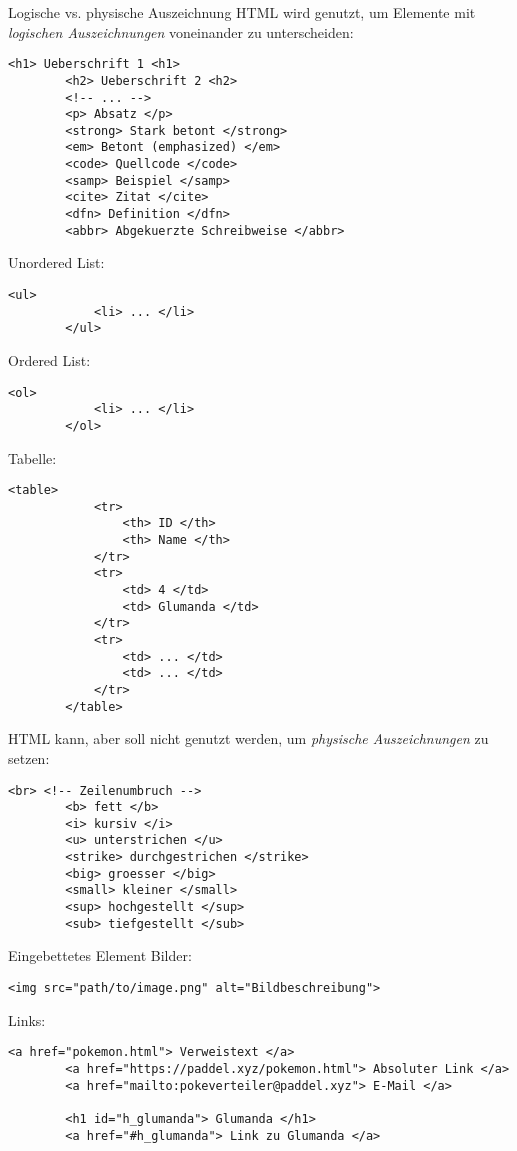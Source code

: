 \begin{bonus}{Logische vs. physische Auszeichnung}
    HTML wird genutzt, um Elemente mit \emph{logischen Auszeichnungen} voneinander zu unterscheiden:

    \begin{lstlisting}[language=html5]
        <h1> Ueberschrift 1 <h1>
        <h2> Ueberschrift 2 <h2>
        <!-- ... -->
        <p> Absatz </p>
        <strong> Stark betont </strong>
        <em> Betont (emphasized) </em>
        <code> Quellcode </code>
        <samp> Beispiel </samp>
        <cite> Zitat </cite>
        <dfn> Definition </dfn>
        <abbr> Abgekuerzte Schreibweise </abbr>
    \end{lstlisting}

    Unordered List:
    \begin{lstlisting}[language=html5]
        <ul>
            <li> ... </li>
        </ul>
    \end{lstlisting}

    Ordered List:
    \begin{lstlisting}[language=html5]
        <ol>
            <li> ... </li>
        </ol>
    \end{lstlisting}

    Tabelle:
    \begin{lstlisting}[language=html5]
        <table>
            <tr> 
                <th> ID </th> 
                <th> Name </th> 
            </tr>
            <tr> 
                <td> 4 </td> 
                <td> Glumanda </td> 
            </tr>
            <tr> 
                <td> ... </td> 
                <td> ... </td> 
            </tr>
        </table>
    \end{lstlisting}

    HTML kann, aber soll nicht genutzt werden, um \emph{physische Auszeichnungen} zu setzen:

    \begin{lstlisting}[language=html5]
        <br> <!-- Zeilenumbruch -->
        <b> fett </b>
        <i> kursiv </i>
        <u> unterstrichen </u>
        <strike> durchgestrichen </strike>
        <big> groesser </big>
        <small> kleiner </small>
        <sup> hochgestellt </sup>
        <sub> tiefgestellt </sub>
    \end{lstlisting}
\end{bonus}

\begin{example}{Eingebettetes Element}
    Bilder:
    \begin{lstlisting}[language=html5]
        <img src="path/to/image.png" alt="Bildbeschreibung">
    \end{lstlisting}

    Links:
    \begin{lstlisting}[language=html5]
        <a href="pokemon.html"> Verweistext </a>
        <a href="https://paddel.xyz/pokemon.html"> Absoluter Link </a>
        <a href="mailto:pokeverteiler@paddel.xyz"> E-Mail </a>
        
        <h1 id="h_glumanda"> Glumanda </h1>
        <a href="#h_glumanda"> Link zu Glumanda </a>
    \end{lstlisting}
\end{example}

